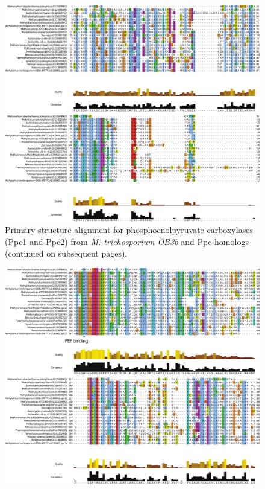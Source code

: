 \begin{figure}[H]
\centering
     \includegraphics[width=1.0\textwidth]{./tex/chapter1/figures/supplemental/FigureS6a.pdf}
     \begin{singlespace}
     \caption[Structure alignment for phosphoenolpyruvate carboxylases (Ppc1 and Ppc2) from \textit{M. trichosporium OB3b} and Ppc-homologs]{
        Primary structure alignment for phosphoenolpyruvate carboxylases (Ppc1 and Ppc2) from \textit{M. trichosporium OB3b} and Ppc-homologs (continued on subsequent pages).
        }
     \label{fig:S6} %
     \end{singlespace}
\end{figure}

\begin{figure}[H]
\centering
     \includegraphics[width=1.0\textwidth]{./tex/chapter1/figures/supplemental/FigureS6c.pdf}
\end{figure}

